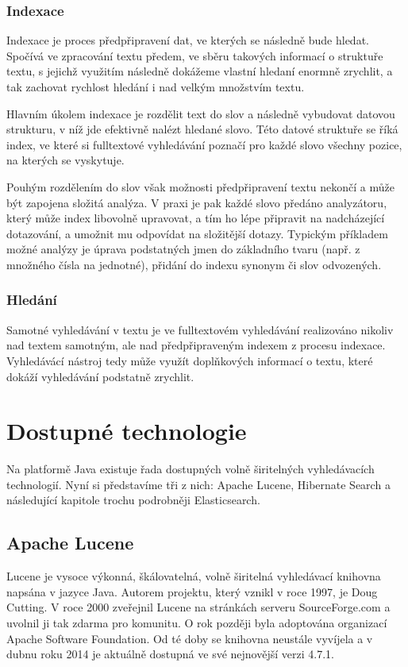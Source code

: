 \documentclass[11pt,draft,oneside]{fithesis2}
\begin{document}
\subsection{Indexace}
Indexace je proces předpřipravení dat, ve kterých se následně bude hledat. Spočívá ve zpracování textu předem, ve sběru takových informací o struktuře textu, s jejichž využitím následně dokážeme vlastní hledaní enormně zrychlit, a tak zachovat rychlost
hledání i nad velkým množstvím textu.

Hlavním úkolem indexace je rozdělit text do slov a následně vybudovat datovou strukturu, v níž jde efektivně nalézt hledané slovo. Této datové struktuře se říká index, ve které si fulltextové vyhledávání poznačí pro každé slovo všechny pozice, na kterých se
vyskytuje. 

Pouhým rozdělením do slov však možnosti předpřipravení textu nekončí a může být zapojena složitá analýza. V praxi je pak každé slovo předáno analyzátoru, který může index libovolně upravovat, a tím ho lépe připravit na nadcházející dotazování, a umožnit mu odpovídat na složitější dotazy. Typickým příkladem možné analýzy 
je úprava podstatných jmen do základního tvaru (např. z množného čísla na jednotné), přidání do indexu synonym či slov odvozených.

\subsection{Hledání}
Samotné vyhledávání v textu je ve fulltextovém vyhledávání realizováno nikoliv nad textem samotným, ale nad předpřipraveným indexem z procesu indexace. Vyhledávácí nástroj tedy může využít doplňkových informací o textu, které dokáží vyhledávání 
podstatně zrychlit.

\chapter{Dostupné technologie}
Na platformě Java existuje řada dostupných volně širitelných vyhledávacích technologií. Nyní si představíme tři z nich: Apache Lucene, Hibernate Search a následující kapitole trochu podrobněji Elasticsearch.

\section{Apache Lucene}
Lucene je vysoce výkonná, škálovatelná, volně širitelná vyhledávací knihovna napsána v jazyce Java. Autorem projektu, který vznikl v roce 1997, je Doug Cutting. V roce 2000 zveřejnil Lucene na stránkách serveru SourceForge.com a uvolnil ji tak zdarma
pro komunitu. O rok později byla adoptována organizací Apache Software Foundation. Od té doby se knihovna neustále vyvíjela a v dubnu roku 2014 je aktuálně dostupná ve své nejnovější verzi 4.7.1.
\end{document}

